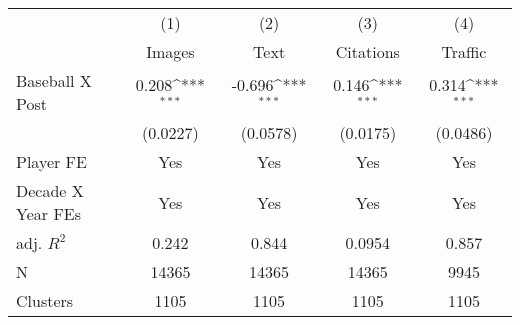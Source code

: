 {
\def\sym#1{\ifmmode^{#1}\else\(^{#1}\)\fi}
\begin{tabular*}{\hsize}{@{\hskip\tabcolsep\extracolsep\fill}l*{4}{c}}
\toprule
            &\multicolumn{1}{c}{(1)}&\multicolumn{1}{c}{(2)}&\multicolumn{1}{c}{(3)}&\multicolumn{1}{c}{(4)}\\
            &\multicolumn{1}{c}{Images}&\multicolumn{1}{c}{Text}&\multicolumn{1}{c}{Citations}&\multicolumn{1}{c}{Traffic}\\
\midrule
Baseball X Post&       0.208\sym{***}&      -0.696\sym{***}&       0.146\sym{***}&       0.314\sym{***}\\
            &    (0.0227)         &    (0.0578)         &    (0.0175)         &    (0.0486)         \\
\midrule
Player FE   &         Yes         &         Yes         &         Yes         &         Yes         \\
Decade X Year FEs&         Yes         &         Yes         &         Yes         &         Yes         \\
adj. $R^2$  &       0.242         &       0.844         &      0.0954         &       0.857         \\
N           &       14365         &       14365         &       14365         &        9945         \\
Clusters    &        1105         &        1105         &        1105         &        1105         \\
\bottomrule
\end{tabular*}
}
